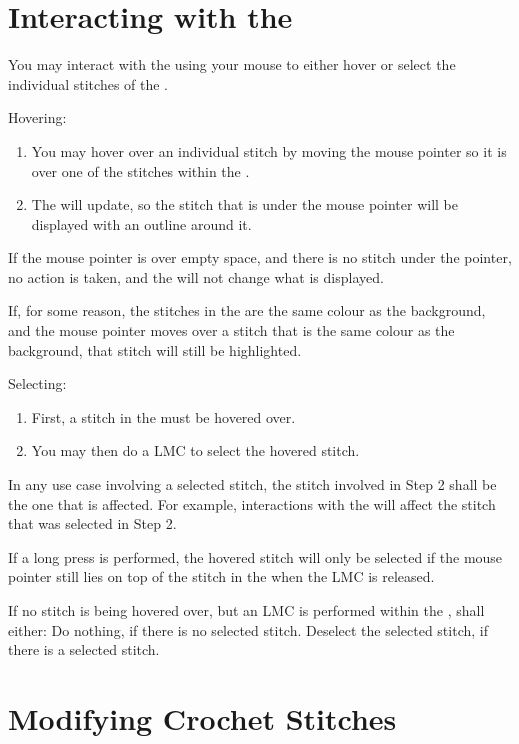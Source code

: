 \documentclass[main.tex]{subfiles}
\begin{document}
\section{Interacting with the \RM}\label{sec:interactrm}

You may interact with the \RM{} using your mouse to either hover or select the individual stitches of the \RM.

Hovering:
\begin{enumerate}
\item You may hover over an individual stitch by moving the mouse pointer so it is over one of the stitches within the \RM.
\item The \CRW{} will update, so the stitch that is under the mouse pointer will be displayed with an outline around it.
\end{enumerate}

If the mouse pointer is over empty space, and there is no stitch under the pointer, no action is taken, and the \CRW{} will not change what is displayed.

If, for some reason, the stitches in the \RM{} are the same colour as the background, and the mouse pointer moves over a stitch that is the same colour as the background, that stitch will still be highlighted.

Selecting:
\begin{enumerate}
\item First, a stitch in the \RM{} must be hovered over. 
\item You may then do a LMC to select the hovered stitch. 
\end{enumerate}

In any use case involving a selected stitch, the stitch involved in Step 2 shall be the one that is affected. For example, interactions with the \PropSidebar{} will affect the stitch that was selected in Step 2.

If a long press is performed, the hovered stitch will only be selected if the mouse pointer still lies on top of the stitch in the \RM{} when the LMC is released.

If no stitch is being hovered over, but an LMC is performed within the \CRW, \CC{} shall either:
Do nothing, if there is no selected stitch.
Deselect the selected stitch, if there is a selected stitch.

\section{Modifying Crochet Stitches}
\end{document}
